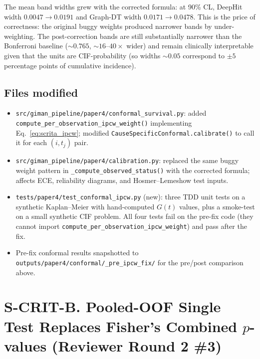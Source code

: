\documentclass[11pt]{article}
\begin{document}
The mean band widths grew with the corrected formula: at 90\% CL, DeepHit width $0.0047 \to 0.0191$ and Graph-DT width $0.0171 \to 0.0478$. This is the price of correctness: the original buggy weights produced narrower bands by under-weighting. The post-correction bands are still substantially narrower than the Bonferroni baseline ($\sim 0.765$, $\sim 16$--$40\times$ wider) and remain clinically interpretable given that the units are CIF-probability (so widths $\sim 0.05$ correspond to $\pm 5$ percentage points of cumulative incidence).

\subsection*{Files modified}

\begin{itemize}\itemsep=0.2em
  \item \texttt{src/giman\_pipeline/paper4/conformal\_survival.py}: added \texttt{compute\_per\_observation\_ipcw\_weight()} implementing Eq.~\ref{eq:scrita_ipcw}; modified \texttt{CauseSpecificConformal.calibrate()} to call it for each $(i, t_j)$ pair.
  \item \texttt{src/giman\_pipeline/paper4/calibration.py}: replaced the same buggy weight pattern in \texttt{\_compute\_observed\_status()} with the corrected formula; affects ECE, reliability diagrams, and Hosmer--Lemeshow test inputs.
  \item \texttt{tests/paper4/test\_conformal\_ipcw.py} (new): three TDD unit tests on a synthetic Kaplan--Meier with hand-computed $G(t)$ values, plus a smoke-test on a small synthetic CIF problem. All four tests fail on the pre-fix code (they cannot import \texttt{compute\_per\_observation\_ipcw\_weight}) and pass after the fix.
  \item Pre-fix conformal results snapshotted to \texttt{outputs/paper4/conformal/\_pre\_ipcw\_fix/} for the pre/post comparison above.
\end{itemize}

\section*{S-CRIT-B. Pooled-OOF Single Test Replaces Fisher's Combined $p$-values (Reviewer Round 2 \#3)}
\label{sec:s-crit-b}
\end{document}
